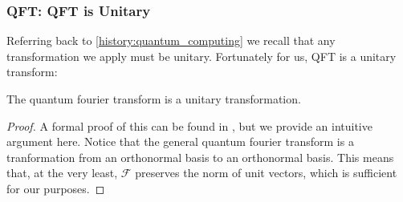 \documentclass{beamer}
\renewcommand{\cal}[1]{\mathcal{#1}}
\begin{document}
\begin{frame}
\frametitle{QFT: QFT is Unitary}
        Referring back to \ref{history:quantum_computing} we recall that any transformation we apply must be unitary.
        Fortunately for us, QFT is a unitary transform:
        \begin{theorem}
                The quantum fourier transform is a unitary transformation.
        \end{theorem}
        \begin{proof}
                A formal proof of this can be found in \cite{perepechaenko}, but we provide an intuitive argument here.
                Notice that the general quantum fourier transform is a tranformation from an orthonormal basis to an orthonormal basis.
                This means that, at the very least, $\cal{F}$ preserves the norm of unit vectors, which is sufficient for our purposes.
        \end{proof}
\end{frame}
        
\end{document}

